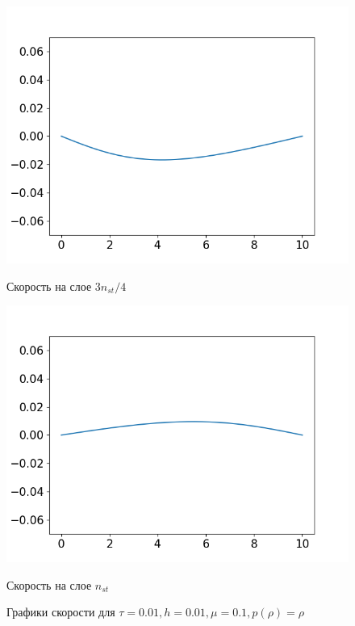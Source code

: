 \begin{figure}[h]
\begin{minipage}[h]{0.47\linewidth}
		\includegraphics[width=1\linewidth]{pics/task2/34u_2.png} 
		\caption{Скорость на слое $3n_{st} / 4$}
	\end{minipage}
	\hfill
	\begin{minipage}[h]{0.47\linewidth}
		\centering
		\includegraphics[width=1\linewidth]{pics/task2/44u_2.png} 
		\caption{Скорость на слое $n_{st}$}
	\end{minipage}
	\caption{Графики скорости для $\tau = 0.01, h = 0.01, \mu = 0.1, p(\rho) = \rho$}
\end{figure}


